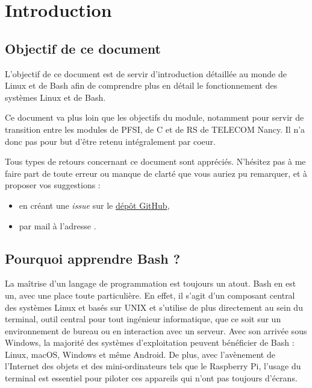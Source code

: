 \section*{Introduction}

\subsection*{Objectif de ce document}
L'objectif de ce document est de servir d'introduction détaillée au monde de Linux et de Bash afin de comprendre plus en détail le fonctionnement des systèmes Linux et de Bash.

Ce document va plus loin que les objectifs du module, notamment pour servir de transition entre les modules de PFSI, de C et de RS de TELECOM Nancy. Il n'a donc pas pour but d'être retenu intégralement par coeur.

 Tous types de retours concernant ce document sont appréciés. N'hésitez pas à me faire part de toute erreur ou manque de clarté que vous auriez pu remarquer, et à proposer vos suggestions :
\begin{itemize}
    \item en créant une \textit{issue} sur le \href{https://github.com/bsegault/linux-shell}{dépôt GitHub},
    \item par mail à l'adresse .
\end{itemize}

\subsection*{Pourquoi apprendre Bash ?}

La maîtrise d'un langage de programmation est toujours un atout. Bash en est un, avec une place toute particulière. En effet, il s'agit d'un composant central des systèmes Linux et basés sur UNIX et s'utilise de plus directement au sein du terminal, outil central pour tout ingénieur informatique, que ce soit sur un environnement de bureau ou en interaction avec un serveur. \newline
Avec son arrivée sous Windows, la majorité des systèmes d'exploitation peuvent bénéficier de Bash : Linux, macOS, Windows et même Android. De plus, avec l'avènement de l'Internet des objets et des mini-ordinateurs tels que le Raspberry Pi, l'usage du terminal est essentiel pour piloter ces appareils qui n'ont pas toujours d'écrans.

